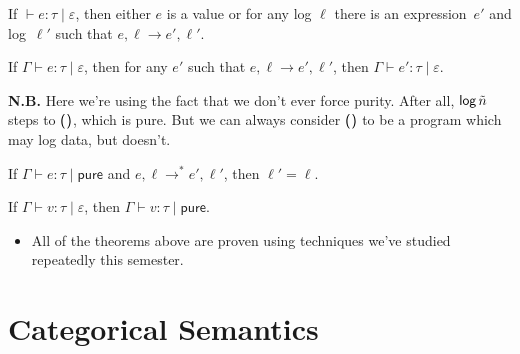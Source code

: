 \documentclass{lecturenotes}
\newcommand{\unit}{\ensuremath{\textsf{(}\mkern0.5mu\textsf{)}}}
\newcommand{\logn}[1]{\ensuremath{\textsf{log}\mkern3mu#1}}
\newcommand{\pureeff}{\textsf{pure}\xspace}
\begin{document}
\begin{thm}[Progress]
  If $\vdash e : \tau \mid \varepsilon$, then either $e$ is a value or for any log $\ell$ there is an expression~$e'$ and log~$\ell'$ such that $e, \ell \to e', \ell'$.
\end{thm}

\begin{thm}[Preservation]
  If $\Gamma \vdash e : \tau \mid \varepsilon$, then for any $e'$ such that $e, \ell \to e', \ell'$, then $\Gamma \vdash e' : \tau \mid \varepsilon$.
\end{thm}

\noindent\textbf{N.B.} Here we're using the fact that we don't ever force purity.
After all, $\logn{\tilde{n}}$ steps to $\unit$, which is pure.
But we can always consider $\unit$ to be a program which may log data, but doesn't.

\begin{thm}
  If $\Gamma \vdash e : \tau \mid \pureeff$ and $e, \ell \to^\ast e', \ell'$, then $\ell' = \ell$.
\end{thm}

\begin{thm}
  If $\Gamma \vdash v : \tau \mid \varepsilon$, then $\Gamma \vdash v : \tau \mid \pureeff$.
\end{thm}

\begin{itemize}
\item All of the theorems above are proven using techniques we've studied repeatedly this semester.
\end{itemize}

\section*{Categorical Semantics}
\label{sec:categ-semant}
\end{document}
